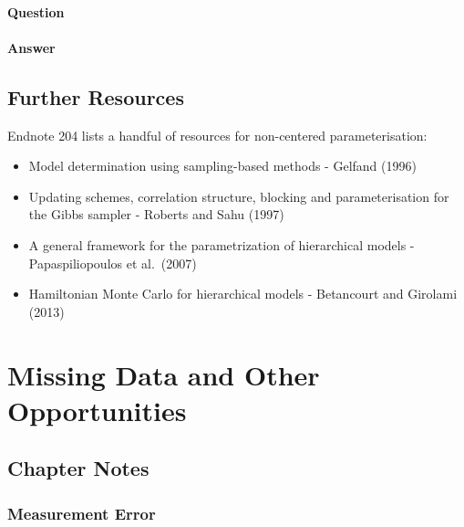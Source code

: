 \documentclass[
]{book}
\providecommand{\tightlist}{%
  \setlength{\itemsep}{0pt}\setlength{\parskip}{0pt}}
\begin{document}
\hypertarget{question-100}{%
\subsubsection*{Question}\label{question-100}}

\hypertarget{answer-100}{%
\subsubsection*{Answer}\label{answer-100}}

\hypertarget{further-resources-4}{%
\section*{Further Resources}\label{further-resources-4}}

Endnote 204 lists a handful of resources for non-centered parameterisation:

\begin{itemize}
\tightlist
\item
  Model determination using sampling-based methods - Gelfand (1996)
\item
  Updating schemes, correlation structure, blocking and parameterisation for the Gibbs sampler - Roberts and Sahu (1997)
\item
  A general framework for the parametrization of hierarchical models - Papaspiliopoulos et al.~(2007)
\item
  Hamiltonian Monte Carlo for hierarchical models - Betancourt and Girolami (2013)
\end{itemize}

\hypertarget{missing_data}{%
\chapter{Missing Data and Other Opportunities}\label{missing_data}}

\hypertarget{chapter-notes-14}{%
\section{Chapter Notes}\label{chapter-notes-14}}

\hypertarget{measurement-error}{%
\subsection*{Measurement Error}\label{measurement-error}}
\end{document}
